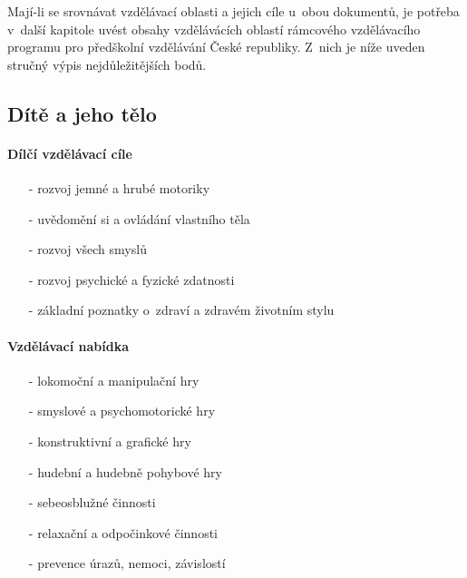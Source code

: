 		Mají-li se srovnávat vzdělávací oblasti a jejich cíle u~obou dokumentů, je potřeba v~další kapitole uvést obsahy vzdělávácích oblastí rámcového vzdělávacího programu pro předškolní vzdělávání České republiky. Z~nich je níže uveden stručný výpis nejdůležitějších bodů. 

			\subsection{Dítě a jeho tělo}
				\textit{} \citep[s.~16]{RVP}

				\paragraph{Dílčí vzdělávací cíle} 

				\begin{itemize}
				\setlength\itemsep{-2mm}
					\item[-]rozvoj jemné a hrubé motoriky
					\item[-]uvědomění si a ovládání vlastního těla
					\item[-]rozvoj všech smyslů
					\item[-]rozvoj psychické a fyzické zdatnosti
					\item[-]základní poznatky o~zdraví a zdravém životním stylu
				\end{itemize}

				\paragraph{Vzdělávací nabídka}

				\begin{itemize}
				\setlength\itemsep{-2mm}
					\item[-]lokomoční a manipulační hry
					\item[-]smyslové a psychomotorické hry
					\item[-]konstruktivní a grafické hry
					\item[-]hudební a hudebně pohybové hry
					\item[-]sebeosblužné činnosti
					\item[-]relaxační a odpočinkové činnosti
					\item[-]prevence úrazů, nemoci, závislostí
				\end{itemize}


